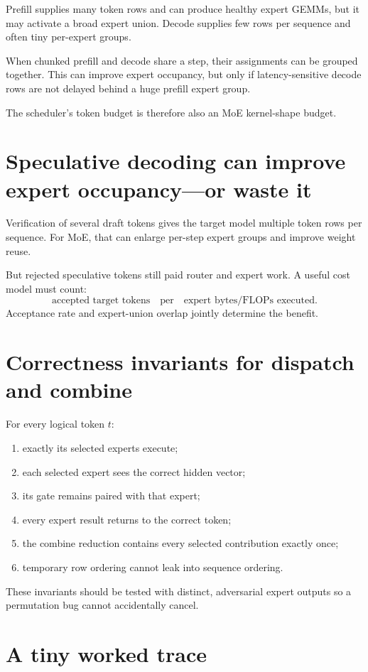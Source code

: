 Prefill supplies many token rows and can produce healthy expert GEMMs, but it may
activate a broad expert union. Decode supplies few rows per sequence and often tiny
per-expert groups.

When chunked prefill and decode share a step, their assignments can be grouped together.
This can improve expert occupancy, but only if latency-sensitive decode rows are not
delayed behind a huge prefill expert group.

The scheduler's token budget is therefore also an MoE kernel-shape budget.

\section{Speculative decoding can improve expert occupancy---or waste it}

Verification of several draft tokens gives the target model multiple token rows per
sequence. For MoE, that can enlarge per-step expert groups and improve weight reuse.

But rejected speculative tokens still paid router and expert work. A useful cost model
must count:
\[
\text{accepted target tokens}
\quad\text{per}\quad
\text{expert bytes/FLOPs executed}.
\]
Acceptance rate and expert-union overlap jointly determine the benefit.

\section{Correctness invariants for dispatch and combine}

For every logical token $t$:
\begin{enumerate}
\item exactly its selected experts execute;
\item each selected expert sees the correct hidden vector;
\item its gate remains paired with that expert;
\item every expert result returns to the correct token;
\item the combine reduction contains every selected contribution exactly once;
\item temporary row ordering cannot leak into sequence ordering.
\end{enumerate}

These invariants should be tested with distinct, adversarial expert outputs so a
permutation bug cannot accidentally cancel.

\section{A tiny worked trace}

